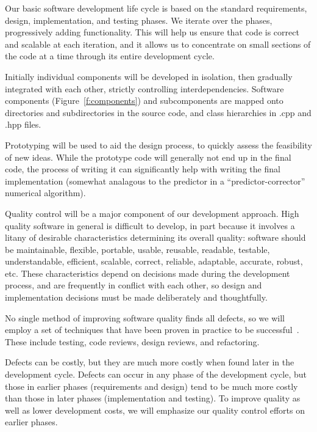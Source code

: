 \documentclass[10pt]{article}
\begin{document}
Our basic software development life cycle is based on the standard
requirements, design, implementation, and testing phases.  We iterate
over the phases, progressively adding functionality.  This will help
us ensure that code is correct and scalable at each iteration, and it
allows us to concentrate on small sections of the code at a time
through its entire development cycle.  

Initially individual components will be developed in isolation, then
gradually integrated with each other, strictly controlling
interdependencies.  Software components (Figure~\ref{f:components})
and subcomponents are mapped onto directories and subdirectories in
the source code, and class hierarchies in .cpp and .hpp files.

Prototyping will be used to aid the design process, to quickly assess
the feasibility of new ideas.  While the prototype code will generally
not end up in the final code, the process of writing it can
significantly help with writing the final implementation (somewhat
analagous to the predictor in a ``predictor-corrector'' numerical
algorithm).

Quality control will be a major component of our development approach.
High quality software in general is difficult to develop, in part
because it involves a litany of desirable characteristics determining
its overall quality: software should be maintainable, flexible,
portable, usable, reusable, readable, testable, understandable,
efficient, scalable, correct, reliable, adaptable, accurate, robust,
etc.  These characteristics depend on decisions made during the
development process, and are frequently in conflict with each other,
so design and implementation decisions must be made deliberately and
thoughtfully.

No single method of improving software quality finds all defects, so
we will employ a set of techniques that have been proven in practice
to be successful~\cite{Mc04}.  These include testing, code reviews, design
reviews, and refactoring.

Defects can be costly, but they are much more costly when found later
in the development cycle.  Defects can occur in any phase of the
development cycle, but those in earlier phases (requirements and
design) tend to be much more costly than those in later phases
(implementation and testing).  To improve quality as well as lower
development costs, we will emphasize our quality control efforts on
earlier phases.
\end{document}
